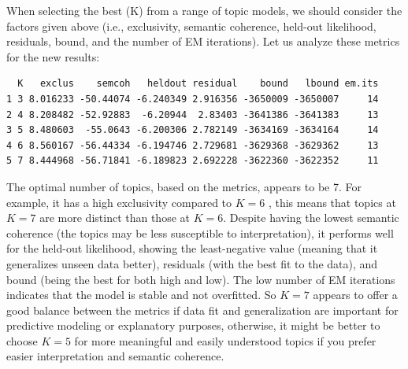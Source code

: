 \begin{Shaded}
\begin{Highlighting}[]
\OtherTok{\textless{}{-}} \SpecialCharTok{$}\SpecialCharTok{$} \SpecialCharTok{:}\NormalTok{, }
                   \SpecialCharTok{\textasciitilde{}}\SpecialCharTok{+} 
                   \SpecialCharTok{$} \NormalTok{)}
\end{Highlighting}
\end{Shaded}

When selecting the best (K) from a range of topic models, we should
consider the factors given above (i.e., exclusivity, semantic coherence,
held-out likelihood, residuals, bound, and the number of EM iterations).
Let us analyze these metrics for the new results:

\begin{verbatim}
  K   exclus    semcoh   heldout residual    bound   lbound em.its
1 3 8.016233 -50.44074 -6.240349 2.916356 -3650009 -3650007     14
2 4 8.208482 -52.92883  -6.20944  2.83403 -3641386 -3641383     13
3 5 8.480603  -55.0643 -6.200306 2.782149 -3634169 -3634164     14
4 6 8.560167 -56.44334 -6.194746 2.729681 -3629368 -3629362     13
5 7 8.444968 -56.71841 -6.189823 2.692228 -3622360 -3622352     11
\end{verbatim}

The optimal number of topics, based on the metrics, appears to be 7. For example, it
has a high exclusivity compared to \(K=6\) , this means that
topics at \(K=7\) are more distinct than those at \(K=6\). Despite having the
lowest semantic coherence (the topics may be less susceptible to interpretation), it
performs well for the held-out likelihood, showing the least-negative
value (meaning that it generalizes unseen data better), residuals (with the best
fit to the data), and bound (being the best for both high and low). The low number of EM iterations indicates that the model is stable and not
overfitted. So \(K=7\) appears to offer a good balance between the
metrics if data fit and generalization are important for predictive
modeling or explanatory purposes, otherwise, it might be better to choose \(K=5\) for
more meaningful and easily understood topics if you prefer easier interpretation and
semantic coherence.


